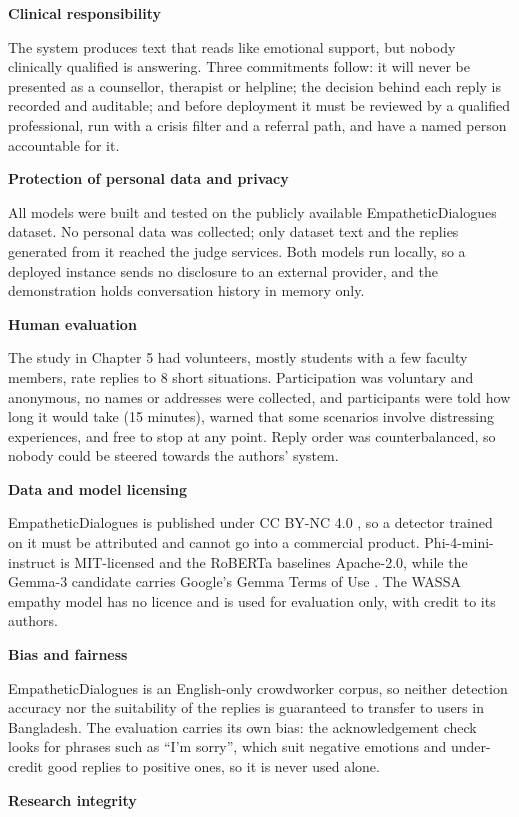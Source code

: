 \textbf{Clinical responsibility}

The system produces text that reads like emotional support, but nobody clinically qualified is answering. Three commitments follow: it will never be presented as a counsellor, therapist or helpline; the decision behind each reply is recorded and auditable; and before deployment it must be reviewed by a qualified professional, run with a crisis filter and a referral path, and have a named person accountable for it.

\textbf{Protection of personal data and privacy}

All models were built and tested on the publicly available EmpatheticDialogues dataset. No personal data was collected; only dataset text and the replies generated from it reached the judge services. Both models run locally, so a deployed instance sends no disclosure to an external provider, and the demonstration holds conversation history in memory only.

\textbf{Human evaluation}

The study in Chapter 5 had volunteers, mostly students with a few faculty members, rate replies to 8 short situations. Participation was voluntary and anonymous, no names or addresses were collected, and participants were told how long it would take (15 minutes), warned that some scenarios involve distressing experiences, and free to stop at any point. Reply order was counterbalanced, so nobody could be steered towards the authors' system.

\textbf{Data and model licensing}

EmpatheticDialogues is published under CC BY-NC 4.0 \cite{ed_github}, so a detector trained on it must be attributed and cannot go into a commercial product. Phi-4-mini-instruct is MIT-licensed and the RoBERTa baselines Apache-2.0, while the Gemma-3 candidate carries Google's Gemma Terms of Use \cite{gemma_terms}. The WASSA empathy model has no licence and is used for evaluation only, with credit to its authors.

\textbf{Bias and fairness}

EmpatheticDialogues is an English-only crowdworker corpus, so neither detection accuracy nor the suitability of the replies is guaranteed to transfer to users in Bangladesh. The evaluation carries its own bias: the acknowledgement check looks for phrases such as ``I'm sorry'', which suit negative emotions and under-credit good replies to positive ones, so it is never used alone.

\textbf{Research integrity}


